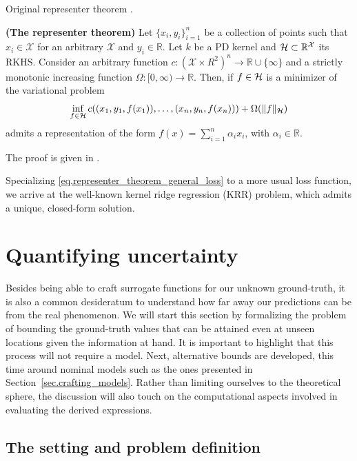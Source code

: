 Original representer theorem \cite{kimeldorf1971some}.

\begin{theorem}
	\textbf{(The representer theorem)}
	Let $\{x_i,y_i\}_{i=1}^n$ be a collection of points such that $x_i \in \mathcal{X}$ for an arbitrary $\mathcal{X}$ and $y_i \in \mathbb{R}$. Let $k$ be a PD kernel and $\mathcal{H} \subset \mathbb{R}^\mathcal{X}$ its RKHS. Consider an arbitrary function $c : (\mathcal{X} \times R^2)^n \rightarrow \mathbb{R} \cup \{\infty\}$ and a strictly monotonic increasing function $\Omega: [0,\infty) \rightarrow \mathbb{R}$. Then, if $f \in \mathcal{H}$ is a minimizer of the variational problem
	\begin{equation}
		\label{eq.representer_theorem_general_loss}
		\inf_{f\in \mathcal{H}} c((x_1,y_1,f(x_1)),\dots,(x_n,y_n,f(x_n))) + \Omega(\Vert f \Vert_{\mathcal{H}})
	\end{equation}
	admits a representation of the form $f(x) = \sum_{i=1}^n \alpha_i x_i$, with $\alpha_i \in \mathbb{R}$. 
\end{theorem}
\begin{my_proof}
	The proof is given in \cite{scholkopf2001generalized}.
\end{my_proof}

Specializing \eqref{eq.representer_theorem_general_loss} to a more usual loss function, we arrive at the well-known kernel ridge regression (KRR) problem, which admits a unique, closed-form solution.


\section{Quantifying uncertainty}

Besides being able to craft surrogate functions for our unknown ground-truth, it is also a common desideratum to understand how far away our predictions can be from the real phenomenon. We will start this section by formalizing the problem of bounding the ground-truth values that can be attained even at unseen locations given the information at hand. It is important to highlight that this process will not require a model. Next, alternative bounds are developed, this time around nominal models such as the ones presented in Section~\ref{sec.crafting_models}. Rather than limiting ourselves to the theoretical sphere, the discussion will also touch on the computational aspects involved in evaluating the derived expressions.

\subsection{The setting and problem definition}

